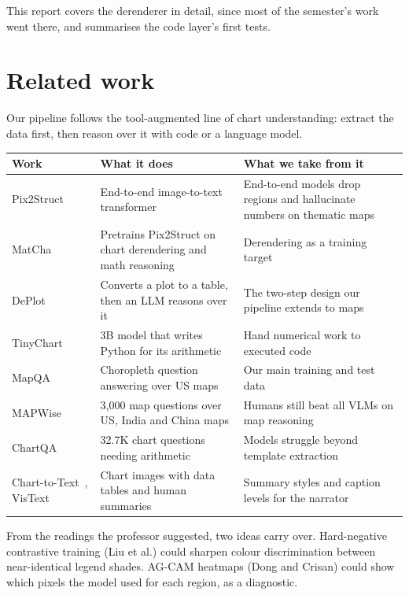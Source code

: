 \documentclass[11pt,a4paper]{article}
\begin{document}
This report covers the derenderer in detail, since most of the semester's work went there, and summarises the code layer's first tests.

\section{Related work}
Our pipeline follows the tool-augmented line of chart understanding: extract the data first, then reason over it with code or a language model.

\begin{center}
\small
\begin{tabularx}{\textwidth}{@{}l L L@{}}
\toprule
Work & What it does & What we take from it\\
\midrule
Pix2Struct~\cite{pix2struct} & End-to-end image-to-text transformer & End-to-end models drop regions and hallucinate numbers on thematic maps\\
MatCha~\cite{matcha} & Pretrains Pix2Struct on chart derendering and math reasoning & Derendering as a training target\\
DePlot~\cite{deplot} & Converts a plot to a table, then an LLM reasons over it & The two-step design our pipeline extends to maps\\
TinyChart~\cite{tinychart} & 3B model that writes Python for its arithmetic & Hand numerical work to executed code\\
MapQA~\cite{mapqa} & Choropleth question answering over US maps & Our main training and test data\\
MAPWise~\cite{mapwise} & 3,000 map questions over US, India and China maps & Humans still beat all VLMs on map reasoning\\
ChartQA~\cite{chartqa} & 32.7K chart questions needing arithmetic & Models struggle beyond template extraction\\
Chart-to-Text~\cite{chart2text}, VisText~\cite{vistext} & Chart images with data tables and human summaries & Summary styles and caption levels for the narrator\\
\bottomrule
\end{tabularx}
\end{center}

From the readings the professor suggested, two ideas carry over. Hard-negative contrastive training (Liu et al.) could sharpen colour discrimination between near-identical legend shades. AG-CAM heatmaps (Dong and Crisan) could show which pixels the model used for each region, as a diagnostic.
\end{document}
